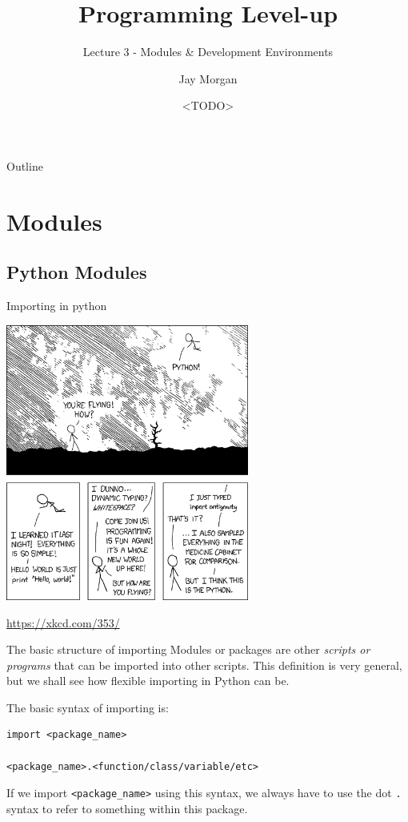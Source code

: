 \documentclass[10pt]{beamer}
\author{Jay Morgan}
\date{<TODO>}
\title{Programming Level-up}
\subtitle{Lecture 3 - Modules \& Development Environments}
\begin{document}
\maketitle
\begin{frame}{Outline}
\tableofcontents
\end{frame}


\section{Modules}
\label{sec:orgc69e217}

\subsection{Python Modules}
\label{sec:org2011c66}

\begin{frame}[label={sec:org1229ce1}]{Importing in python}
\begin{center}
\includegraphics[width=0.6\textwidth]{images/python.png}
\end{center}
\url{https://xkcd.com/353/}
\end{frame}

\begin{frame}[label={sec:org48ef110},fragile]{The basic structure of importing}
 Modules or packages are other \emph{scripts or programs} that can be imported into other
scripts. This definition is very general, but we shall see how flexible importing in
Python can be.

The basic syntax of importing is:

\begin{verbatim}
import <package_name>

<package_name>.<function/class/variable/etc>
\end{verbatim}

If we import \texttt{<package\_name>} using this syntax, we always have to use the dot \texttt{.} syntax
to refer to something within this package.
\end{frame}
\end{document}
